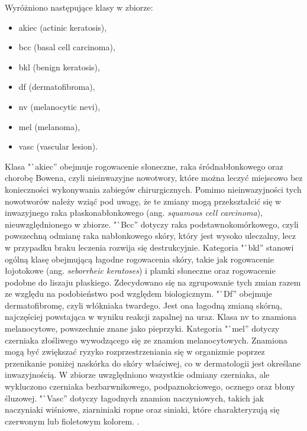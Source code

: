 Wyróżniono następujące klasy w zbiorze:
\begin{itemize}
	\item akiec (actinic keratosis),
	\item bcc (basal cell carcinoma),
	\item bkl (benign keratosis),
	\item df (dermatofibroma),
	\item nv (melanocytic nevi),
	\item mel (melanoma),
	\item vasc (vascular lesion).
\end{itemize}

Klasa "`akiec'' obejmuje rogowacenie słoneczne, raka śródnabłonkowego oraz chorobę Bowena, czyli nieinwazyjne nowotwory, które można leczyć miejscowo bez konieczności wykonywania zabiegów chirurgicznych.
Pomimo nieinwazyjności tych nowotworów należy wziąć pod uwagę, że te zmiany mogą przekształcić się w inwazyjnego raka płaskonabłonkowego (ang. \textit{squamous cell carcinoma}), nieuwzględnionego w zbiorze.
"`Bcc'' dotyczy raka podstawnokomórkowego, czyli powszechną odmianę raka nabłonkowego skóry, który jest wysoko uleczalny, lecz w przypadku braku leczenia rozwija się destrukcyjnie.
Kategoria "`bkl'' stanowi ogólną klasę obejmującą łagodne rogowacenia skóry, takie jak rogowacenie łojotokowe (ang. \textit{seborrheic keratoses}) i plamki słoneczne oraz rogowacenie podobne do liszaju płaskiego.
Zdecydowano się na zgrupowanie tych zmian razem ze względu na podobieństwo pod względem biologicznym.
"`Df'' obejmuje dermatofibromę, czyli włókniaka twardego.
Jest ona łagodną zmianą skórną, najczęściej powstająca w wyniku reakcji zapalnej na uraz.
Klasa nv to znamiona melanocytowe, powszechnie znane jako pieprzyki.
Kategoria "`mel'' dotyczy czerniaka złośliwego wywodzącego się ze znamion melanocytowych.
Znamiona mogą być zwiększać ryzyko rozprzestrzeniania się w organizmie poprzez przenikanie poniżej naskórka do skóry właściwej, co w dermatologii jest określane inwazyjnością.
W zbiorze uwzględniono wszystkie odmiany czerniaka, ale wykluczono czerniaka bezbarwnikowego, podpaznokciowego, ocznego oraz błony śluzowej.
"`Vasc'' dotyczy łagodnych znamion naczyniowych, takich jak naczyniaki wiśniowe, ziarniniaki ropne oraz siniaki, które charakteryzują się czerwonym lub fioletowym kolorem.
\cite{Kittler_2018}.

